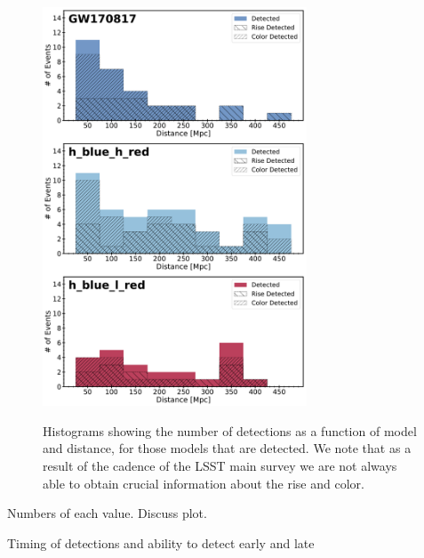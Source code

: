 \begin{figure}[!t]
\begin{center}
\hspace*{-0.1in}
\scalebox{1.}
{\includegraphics[width=0.7\textwidth]{./figs/chapter6/f1.pdf}}
\caption{\singlespace Histograms showing the number of detections as a function of model and distance, for those models that are detected. We note that as a result of the cadence of the LSST main survey we are not always able to obtain crucial information about the rise and color.}
\label{fig:ch6_eff_hist}
\end{center}
\end{figure}

Numbers of each value. Discuss plot.

Timing of detections and ability to detect early and late

